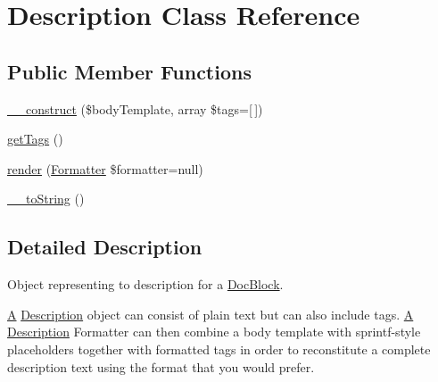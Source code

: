 \hypertarget{classphp_documentor_1_1_reflection_1_1_doc_block_1_1_description}{}\section{Description Class Reference}
\label{classphp_documentor_1_1_reflection_1_1_doc_block_1_1_description}
\subsection*{Public Member Functions}
\begin{DoxyCompactItemize}
\item 
\mbox{\hyperlink{classphp_documentor_1_1_reflection_1_1_doc_block_1_1_description_a639cea7453817a0b941f29892a37edc3}{\+\_\+\+\_\+construct}} (\$body\+Template, array \$tags=\mbox{[}$\,$\mbox{]})
\item 
\mbox{\hyperlink{classphp_documentor_1_1_reflection_1_1_doc_block_1_1_description_ae07173ab06a20e2f5bd928cc0518e01f}{get\+Tags}} ()
\item 
\mbox{\hyperlink{classphp_documentor_1_1_reflection_1_1_doc_block_1_1_description_ac20fbfe3216d76776b5e743bd16427f9}{render}} (\mbox{\hyperlink{interfacephp_documentor_1_1_reflection_1_1_doc_block_1_1_tags_1_1_formatter}{Formatter}} \$formatter=null)
\item 
\mbox{\hyperlink{classphp_documentor_1_1_reflection_1_1_doc_block_1_1_description_a7516ca30af0db3cdbf9a7739b48ce91d}{\+\_\+\+\_\+to\+String}} ()
\end{DoxyCompactItemize}


\subsection{Detailed Description}
Object representing to description for a \mbox{\hyperlink{classphp_documentor_1_1_reflection_1_1_doc_block}{Doc\+Block}}.

\mbox{\hyperlink{class_a}{A}} \mbox{\hyperlink{classphp_documentor_1_1_reflection_1_1_doc_block_1_1_description}{Description}} object can consist of plain text but can also include tags. \mbox{\hyperlink{class_a}{A}} \mbox{\hyperlink{classphp_documentor_1_1_reflection_1_1_doc_block_1_1_description}{Description}} Formatter can then combine a body template with sprintf-\/style placeholders together with formatted tags in order to reconstitute a complete description text using the format that you would prefer.

